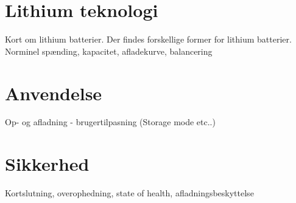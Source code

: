 \section{Lithium teknologi}
Kort om lithium batterier.
Der findes forskellige former for lithium batterier. 
Norminel spænding, kapacitet, afladekurve, balancering

\section{Anvendelse}
Op- og afladning - brugertilpasning (Storage mode etc..)

\section{Sikkerhed}

Kortslutning, overophedning, state of health, afladningsbeskyttelse
